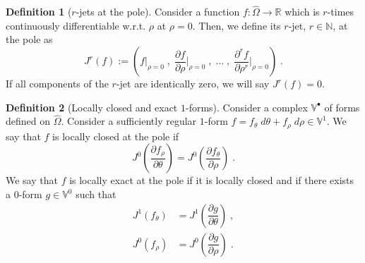 \documentclass[10pt]{article}
\newcommand{\RR}{{\mathbb{R}}}
\newcommand{\NN}{{\mathbb{N}}}
\newcommand{\vSpace}[1]{\mathbb{#1}}
\newcommand{\complex}[1]{\mathit{\vSpace{#1}^\bullet}}
\newcommand{\tpDomain}{\widehat{\Omega}}
\newcommand{\cU}{\theta}
\newcommand{\cV}{\rho}
\newcommand{\dcU}{\mathit{d\cU}}
\newcommand{\dcV}{\mathit{d\cV}}
\newcommand{\jet}[2]{J^{#1}\left(#2\right)}
\theoremstyle{plain}
\theoremstyle{definition}
\newtheorem{definition}{Definition}[section]
\theoremstyle{remark}
\begin{document}
\begin{definition}[$r$-jets at the pole]
    Consider a function $f : \tpDomain \rightarrow \RR$ which is $r$-times continuously differentiable w.r.t. $\cV$ at $\cV = 0$.
    Then, we define its $r$-jet, $r \in \NN$, at the pole as
    \begin{equation*}
        \jet{r}{f} := \left(
            f\big|_{\cV = 0}\;,\; \dfrac{\partial f}{\partial \cV}\big|_{\cV = 0}\;,\; \dots\;,\;\dfrac{\partial^r f}{\partial \cV^r}\big|_{\cV = 0}
        \right)\;.
    \end{equation*}
    If all components of the $r$-jet are identically zero, we will say $\jet{r}{f} = 0$.
\end{definition}
\begin{definition}[Locally closed and exact $1$-forms]\label{def:locally-closed-exact}
    Consider a complex $\complex{V}$ of forms defined on $\tpDomain$.
    Consider a sufficiently regular $1$-form $f = f_\cU\;\dcU + f_\cV\;\dcV \in \vSpace{V}^1$.
    We say that $f$ is locally closed at the pole if
    \begin{equation*}
        \jet{0}{\dfrac{\partial f_\cV}{\partial \cU}} = \jet{0}{\dfrac{\partial f_\cU}{\partial \cV}}\;.
    \end{equation*}
    We say that $f$ is locally exact at the pole if it is locally closed and if there exists a $0$-form $g \in \vSpace{V}^0$ such that
    \begin{equation*}
        \begin{split}
            \jet{1}{f_\cU} &= \jet{1}{\dfrac{\partial g}{\partial \cU}}\;,\\
            \jet{0}{f_\cV} &= \jet{0}{\dfrac{\partial g}{\partial \cV}}\;.
        \end{split}
    \end{equation*}
\end{definition}
\end{document}
